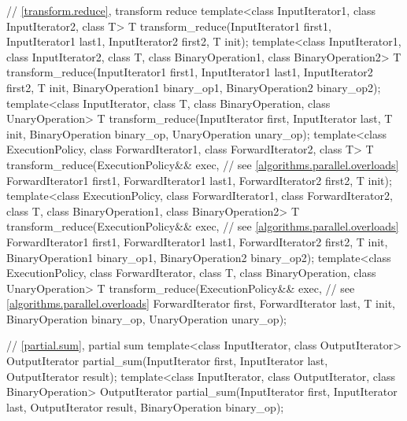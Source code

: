 \begin{codeblock}
{  // \ref{transform.reduce}, transform reduce
  template<class InputIterator1, class InputIterator2, class T>
    T transform_reduce(InputIterator1 first1, InputIterator1 last1,
                       InputIterator2 first2, T init);
  template<class InputIterator1, class InputIterator2, class T,
           class BinaryOperation1, class BinaryOperation2>
    T transform_reduce(InputIterator1 first1, InputIterator1 last1,
                       InputIterator2 first2, T init,
                       BinaryOperation1 binary_op1, BinaryOperation2 binary_op2);
  template<class InputIterator, class T,
           class BinaryOperation, class UnaryOperation>
    T transform_reduce(InputIterator first, InputIterator last, T init,
                       BinaryOperation binary_op, UnaryOperation unary_op);
  template<class ExecutionPolicy,
           class ForwardIterator1, class ForwardIterator2, class T>
    T transform_reduce(ExecutionPolicy&& exec,                  // see \ref{algorithms.parallel.overloads}
                       ForwardIterator1 first1, ForwardIterator1 last1,
                       ForwardIterator2 first2, T init);
  template<class ExecutionPolicy,
           class ForwardIterator1, class ForwardIterator2, class T,
           class BinaryOperation1, class BinaryOperation2>
    T transform_reduce(ExecutionPolicy&& exec,                  // see \ref{algorithms.parallel.overloads}
                       ForwardIterator1 first1, ForwardIterator1 last1,
                       ForwardIterator2 first2, T init,
                       BinaryOperation1 binary_op1, BinaryOperation2 binary_op2);
  template<class ExecutionPolicy, class ForwardIterator, class T,
           class BinaryOperation, class UnaryOperation>
    T transform_reduce(ExecutionPolicy&& exec,                  // see \ref{algorithms.parallel.overloads}
                       ForwardIterator first, ForwardIterator last, T init,
                       BinaryOperation binary_op, UnaryOperation unary_op);

  // \ref{partial.sum}, partial sum
  template<class InputIterator, class OutputIterator>
    OutputIterator
      partial_sum(InputIterator first, InputIterator last,
                  OutputIterator result);
  template<class InputIterator, class OutputIterator, class BinaryOperation>
    OutputIterator
      partial_sum(InputIterator first, InputIterator last,
                  OutputIterator result, BinaryOperation binary_op);

}
\end{codeblock}
